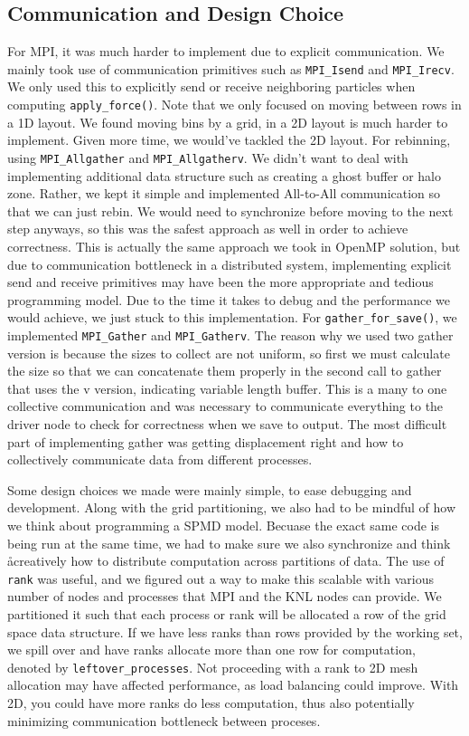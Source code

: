 \documentclass{article}
\begin{document}
\subsection{Communication and Design Choice}
For MPI, it was much harder to implement due to explicit communication. We mainly took use of communication primitives such as \verb|MPI_Isend| and \verb|MPI_Irecv|. We only used this to explicitly send or receive neighboring particles when computing \verb|apply_force()|. Note that we only focused on moving between rows in a 1D layout. We found moving bins by a grid, in a 2D layout is much harder to implement. Given more time, we would've tackled the 2D layout. For rebinning, using \verb|MPI_Allgather| and \verb|MPI_Allgatherv|. We didn't want to deal with implementing additional data structure such as creating a ghost buffer or halo zone. Rather, we kept it simple and implemented All-to-All communication so that we can just rebin. We would need to synchronize before moving to the next step anyways, so this was the safest approach as well in order to achieve correctness. This is actually the same approach we took in OpenMP solution, but due to communication bottleneck in a distributed system, implementing explicit send and receive primitives may have been the more appropriate and tedious programming model. Due to the time it takes to debug and the performance we would achieve, we just stuck to this implementation. For \verb|gather_for_save()|, we implemented \verb|MPI_Gather| and \verb|MPI_Gatherv|. The reason why we used two gather version is because the sizes to collect are not uniform, so first we must calculate the size so that we can concatenate them properly in the second call to gather that uses the v version, indicating variable length buffer. This is a many to one collective communication and was necessary to communicate everything to the driver node to check for correctness when we save to output. The most difficult part of implementing gather was getting displacement right and how to collectively communicate data from different processes.

Some design choices we made were mainly simple, to ease debugging and development. Along with the grid partitioning, we also had to be mindful of how we think about programming a SPMD model. Becuase the exact same code is being run at the same time, we had to make sure we also synchronize and think åcreatively how to distribute computation across partitions of data. The use of \verb|rank| was useful, and we figured out a way to make this scalable with various number of nodes and processes that MPI and the KNL nodes can provide. We partitioned it such that each process or rank will be allocated a row of the grid space data structure. If we have less ranks than rows provided by the working set, we spill over and have ranks allocate more than one row for computation, denoted by \verb|leftover_processes|. Not proceeding with a rank to 2D mesh allocation may have affected performance, as load balancing could improve. With 2D, you could have more ranks do less computation, thus also potentially minimizing communication bottleneck between proceses.
\end{document}
